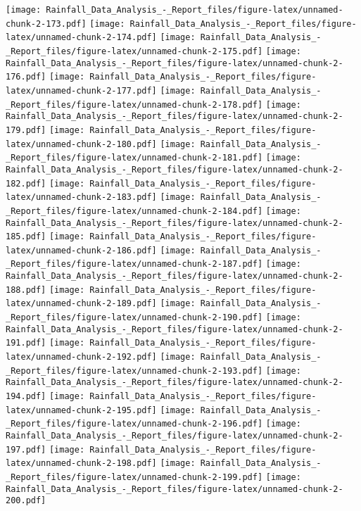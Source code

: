 \documentclass[
]{article}
\begin{document}
\texttt{[image: Rainfall\_Data\_Analysis\_-\_Report\_files/figure-latex/unnamed-chunk-2-173.pdf]}
\texttt{[image: Rainfall\_Data\_Analysis\_-\_Report\_files/figure-latex/unnamed-chunk-2-174.pdf]}
\texttt{[image: Rainfall\_Data\_Analysis\_-\_Report\_files/figure-latex/unnamed-chunk-2-175.pdf]}
\texttt{[image: Rainfall\_Data\_Analysis\_-\_Report\_files/figure-latex/unnamed-chunk-2-176.pdf]}
\texttt{[image: Rainfall\_Data\_Analysis\_-\_Report\_files/figure-latex/unnamed-chunk-2-177.pdf]}
\texttt{[image: Rainfall\_Data\_Analysis\_-\_Report\_files/figure-latex/unnamed-chunk-2-178.pdf]}
\texttt{[image: Rainfall\_Data\_Analysis\_-\_Report\_files/figure-latex/unnamed-chunk-2-179.pdf]}
\texttt{[image: Rainfall\_Data\_Analysis\_-\_Report\_files/figure-latex/unnamed-chunk-2-180.pdf]}
\texttt{[image: Rainfall\_Data\_Analysis\_-\_Report\_files/figure-latex/unnamed-chunk-2-181.pdf]}
\texttt{[image: Rainfall\_Data\_Analysis\_-\_Report\_files/figure-latex/unnamed-chunk-2-182.pdf]}
\texttt{[image: Rainfall\_Data\_Analysis\_-\_Report\_files/figure-latex/unnamed-chunk-2-183.pdf]}
\texttt{[image: Rainfall\_Data\_Analysis\_-\_Report\_files/figure-latex/unnamed-chunk-2-184.pdf]}
\texttt{[image: Rainfall\_Data\_Analysis\_-\_Report\_files/figure-latex/unnamed-chunk-2-185.pdf]}
\texttt{[image: Rainfall\_Data\_Analysis\_-\_Report\_files/figure-latex/unnamed-chunk-2-186.pdf]}
\texttt{[image: Rainfall\_Data\_Analysis\_-\_Report\_files/figure-latex/unnamed-chunk-2-187.pdf]}
\texttt{[image: Rainfall\_Data\_Analysis\_-\_Report\_files/figure-latex/unnamed-chunk-2-188.pdf]}
\texttt{[image: Rainfall\_Data\_Analysis\_-\_Report\_files/figure-latex/unnamed-chunk-2-189.pdf]}
\texttt{[image: Rainfall\_Data\_Analysis\_-\_Report\_files/figure-latex/unnamed-chunk-2-190.pdf]}
\texttt{[image: Rainfall\_Data\_Analysis\_-\_Report\_files/figure-latex/unnamed-chunk-2-191.pdf]}
\texttt{[image: Rainfall\_Data\_Analysis\_-\_Report\_files/figure-latex/unnamed-chunk-2-192.pdf]}
\texttt{[image: Rainfall\_Data\_Analysis\_-\_Report\_files/figure-latex/unnamed-chunk-2-193.pdf]}
\texttt{[image: Rainfall\_Data\_Analysis\_-\_Report\_files/figure-latex/unnamed-chunk-2-194.pdf]}
\texttt{[image: Rainfall\_Data\_Analysis\_-\_Report\_files/figure-latex/unnamed-chunk-2-195.pdf]}
\texttt{[image: Rainfall\_Data\_Analysis\_-\_Report\_files/figure-latex/unnamed-chunk-2-196.pdf]}
\texttt{[image: Rainfall\_Data\_Analysis\_-\_Report\_files/figure-latex/unnamed-chunk-2-197.pdf]}
\texttt{[image: Rainfall\_Data\_Analysis\_-\_Report\_files/figure-latex/unnamed-chunk-2-198.pdf]}
\texttt{[image: Rainfall\_Data\_Analysis\_-\_Report\_files/figure-latex/unnamed-chunk-2-199.pdf]}
\texttt{[image: Rainfall\_Data\_Analysis\_-\_Report\_files/figure-latex/unnamed-chunk-2-200.pdf]}
\end{document}
